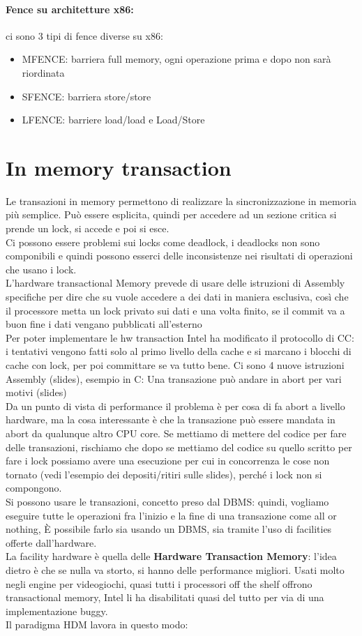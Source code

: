 \documentclass[12pt, oneside]{extbook} %
\begin{document}
\paragraph{Fence su architetture x86:} ci sono 3 tipi di fence diverse su x86:
\begin{itemize}
\item MFENCE: barriera full memory, ogni operazione prima e dopo non sarà riordinata
\item SFENCE: barriera store/store
\item LFENCE: barriere load/load e Load/Store
\end{itemize}
\section{In memory transaction}
Le transazioni in memory permettono di realizzare la sincronizzazione in memoria più semplice. Può essere esplicita, quindi per accedere ad un sezione critica si prende un lock, si accede e poi si esce.\\ Ci possono essere problemi sui locks come deadlock, i deadlocks non sono componibili e quindi possono esserci delle inconsistenze nei risultati di operazioni che usano i lock.\\ L'hardware transactional Memory prevede di usare delle istruzioni di Assembly specifiche per dire che su vuole accedere a dei dati in maniera esclusiva, così che il processore metta un lock privato sui dati e una volta finito, se il commit va a buon fine i dati vengano pubblicati all'esterno\\ Per poter implementare le hw transaction Intel ha modificato il protocollo di CC: i tentativi vengono fatti solo al primo livello della cache e si marcano i blocchi di cache con lock, per poi committare se va tutto bene. Ci sono 4 nuove istruzioni Assembly (slides), esempio in C:
Una transazione può andare in abort per vari motivi (slides)\\ Da un punto di vista di performance il problema è per cosa di fa abort a livello hardware, ma la cosa interessante è che la transazione può essere mandata in abort da qualunque altro CPU core.
Se mettiamo di mettere del codice per fare delle transazioni, rischiamo che dopo se mettiamo del codice su quello scritto per fare i lock possiamo avere una esecuzione per cui in concorrenza le cose non tornato (vedi l'esempio dei depositi/ritiri sulle slides), perché i lock non si compongono.\\ Si possono usare le transazioni, concetto preso dal DBMS: quindi, vogliamo eseguire tutte le operazioni fra l'inizio e la fine di una transazione come all or nothing, È possibile farlo sia usando un DBMS, sia tramite l'uso di facilities offerte dall'hardware.\\ La facility hardware è quella delle \textbf{Hardware Transaction Memory}: l'idea dietro è che se nulla va storto, si hanno delle performance migliori. Usati molto negli engine per videogiochi, quasi tutti i processori off the shelf offrono transactional memory, Intel li ha disabilitati quasi del tutto per via di una implementazione buggy.\\ Il paradigma HDM lavora in questo modo:
\end{document}
